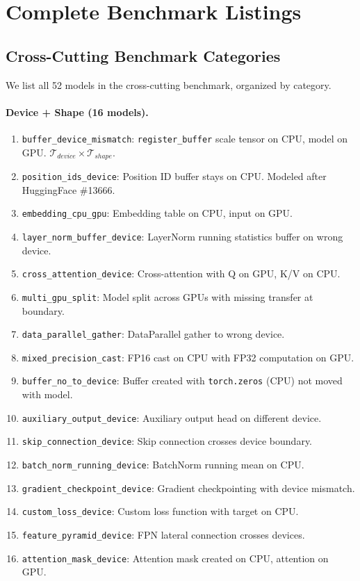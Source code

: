 \documentclass[10pt]{article}
\newcommand{\Tshape}{\mathcal{T}_{\mathit{shape}}}
\newcommand{\Tdevice}{\mathcal{T}_{\mathit{device}}}
\theoremstyle{plain}
\theoremstyle{definition}
\theoremstyle{remark}
\begin{document}
\section{Complete Benchmark Listings}\label{app:benchmarks}

\subsection{Cross-Cutting Benchmark Categories}

We list all 52 models in the cross-cutting benchmark, organized by
category.

\paragraph{Device + Shape (16 models).}
\begin{enumerate}[nosep,leftmargin=2em]
  \item \texttt{buffer\_device\_mismatch}: \texttt{register\_buffer}
    scale tensor on CPU, model on GPU.  $\Tdevice \times \Tshape$.
  \item \texttt{position\_ids\_device}: Position ID buffer stays on
    CPU.  Modeled after HuggingFace \#13666.
  \item \texttt{embedding\_cpu\_gpu}: Embedding table on CPU, input
    on GPU.
  \item \texttt{layer\_norm\_buffer\_device}: LayerNorm running
    statistics buffer on wrong device.
  \item \texttt{cross\_attention\_device}: Cross-attention with Q on
    GPU, K/V on CPU.
  \item \texttt{multi\_gpu\_split}: Model split across GPUs with
    missing transfer at boundary.
  \item \texttt{data\_parallel\_gather}: DataParallel gather to wrong
    device.
  \item \texttt{mixed\_precision\_cast}: FP16 cast on CPU with FP32
    computation on GPU.
  \item \texttt{buffer\_no\_to\_device}: Buffer created with
    \texttt{torch.zeros} (CPU) not moved with model.
  \item \texttt{auxiliary\_output\_device}: Auxiliary output head on
    different device.
  \item \texttt{skip\_connection\_device}: Skip connection crosses
    device boundary.
  \item \texttt{batch\_norm\_running\_device}: BatchNorm running mean
    on CPU.
  \item \texttt{gradient\_checkpoint\_device}: Gradient checkpointing
    with device mismatch.
  \item \texttt{custom\_loss\_device}: Custom loss function with
    target on CPU.
  \item \texttt{feature\_pyramid\_device}: FPN lateral connection
    crosses devices.
  \item \texttt{attention\_mask\_device}: Attention mask created on
    CPU, attention on GPU.
\end{enumerate}
\end{document}
